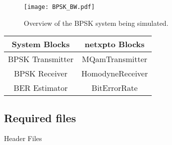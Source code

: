\begin{figure}[h]
\centering
\texttt{[image: BPSK\_BW.pdf]}
\caption{Overview of the BPSK system being simulated.}
\label{fig:homodynesystem}
\end{figure}

\begin{table}[H]
\centering
\begin{tabular}{c|c}
System Blocks    & netxpto Blocks   \\ \hline
BPSK Transmitter & MQamTransmitter  \\
BPSK Receiver    & HomodyneReceiver \\
BER Estimator    & BitErrorRate
\end{tabular}
\end{table}

\subsection*{Required files}\label{Required files}

Header Files

